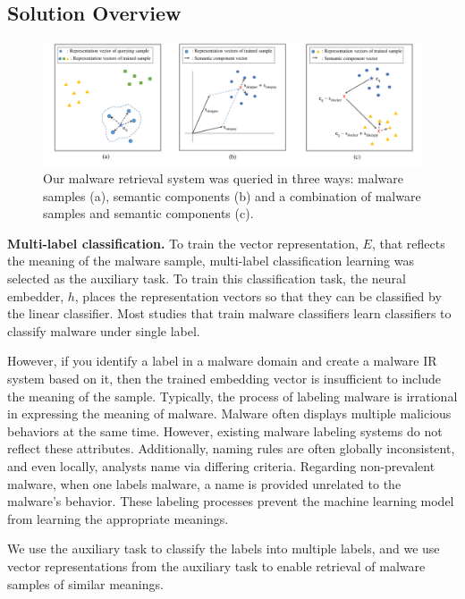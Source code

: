 \subsection{Solution Overview}
\begin{figure}[!htb] %
  \includegraphics[width=\textwidth]{../../figures/qualitative_all_fix2.pdf}
  \caption{Our malware retrieval system was queried in three ways: malware samples (a), semantic components (b) and a combination of malware samples and semantic components (c).}
  \label{fig:qualitative_all}
\end{figure}

\textbf{Multi-label classification. }
To train the vector representation, $E$, that reflects the meaning of the malware sample, multi-label classification learning was selected as the auxiliary task. To train this classification task, the neural embedder, $h$, places the representation vectors so that they can be classified by the linear classifier. Most studies that train malware classifiers learn classifiers to classify malware under single label.

However, if you identify a label in a malware domain and create a malware IR system based on it, then the trained embedding vector is insufficient to include the meaning of the sample. Typically, the process of labeling malware is irrational in expressing the meaning of malware. Malware often displays multiple malicious behaviors at the same time. However, existing malware labeling systems do not reflect these attributes. Additionally, naming rules are often globally inconsistent, and even locally, analysts name via differing criteria. Regarding non-prevalent malware, when one labels malware, a name is provided unrelated to the malware’s behavior. These labeling processes prevent the machine learning model from learning the appropriate meanings. 

We use the auxiliary task to classify the labels into multiple labels, and we use vector representations from the auxiliary task to enable retrieval of malware samples of similar meanings.

